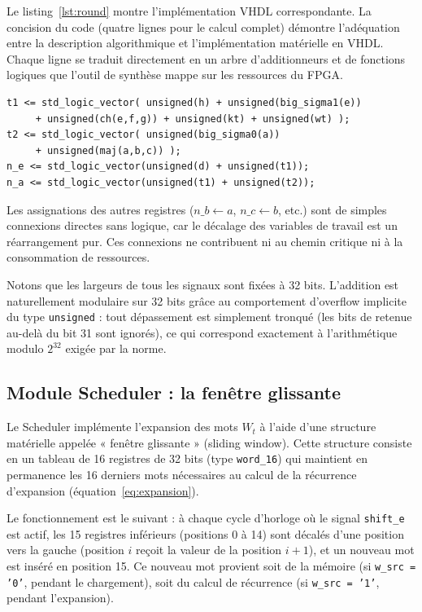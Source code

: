 Le listing~\ref{lst:round} montre l'implémentation VHDL correspondante. La concision du code (quatre lignes pour le calcul complet) démontre l'adéquation entre la description algorithmique et l'implémentation matérielle en VHDL. Chaque ligne se traduit directement en un arbre d'additionneurs et de fonctions logiques que l'outil de synthèse mappe sur les ressources du FPGA.

\begin{lstlisting}[caption={Round.vhd -- calcul combinatoire d'une ronde complète},label={lst:round}]
t1 <= std_logic_vector( unsigned(h) + unsigned(big_sigma1(e))
     + unsigned(ch(e,f,g)) + unsigned(kt) + unsigned(wt) );
t2 <= std_logic_vector( unsigned(big_sigma0(a))
     + unsigned(maj(a,b,c)) );
n_e <= std_logic_vector(unsigned(d) + unsigned(t1));
n_a <= std_logic_vector(unsigned(t1) + unsigned(t2));
\end{lstlisting}

Les assignations des autres registres ($n\_b \leftarrow a$, $n\_c \leftarrow b$, etc.) sont de simples connexions directes sans logique, car le décalage des variables de travail est un réarrangement pur. Ces connexions ne contribuent ni au chemin critique ni à la consommation de ressources.

Notons que les largeurs de tous les signaux sont fixées à 32 bits. L'addition est naturellement modulaire sur 32 bits grâce au comportement d'overflow implicite du type \texttt{unsigned} : tout dépassement est simplement tronqué (les bits de retenue au-delà du bit 31 sont ignorés), ce qui correspond exactement à l'arithmétique modulo $2^{32}$ exigée par la norme.

\subsection{Module Scheduler : la fenêtre glissante}

Le Scheduler implémente l'expansion des mots $W_t$ à l'aide d'une structure matérielle appelée « fenêtre glissante » (sliding window). Cette structure consiste en un tableau de 16 registres de 32 bits (type \texttt{word\_16}) qui maintient en permanence les 16 derniers mots nécessaires au calcul de la récurrence d'expansion (équation~\ref{eq:expansion}).

Le fonctionnement est le suivant : à chaque cycle d'horloge où le signal \texttt{shift\_e} est actif, les 15 registres inférieurs (positions 0 à 14) sont décalés d'une position vers la gauche (position $i$ reçoit la valeur de la position $i+1$), et un nouveau mot est inséré en position 15. Ce nouveau mot provient soit de la mémoire (si \texttt{w\_src = '0'}, pendant le chargement), soit du calcul de récurrence (si \texttt{w\_src = '1'}, pendant l'expansion).

